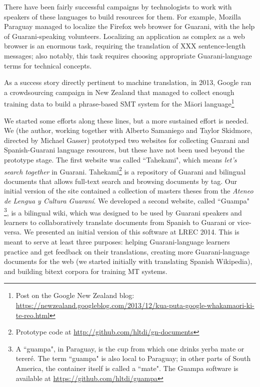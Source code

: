 There have been fairly successful campaigns by technologists to work with
speakers of these languages to build resources for them.
For example, Mozilla Paraguay managed to localize the Firefox web browser for
Guarani, with the help of Guarani-speaking volunteers. Localizing an
application as complex as a web browser is an enormous task, requiring the
translation of XXX sentence-length messages; also notably, this task requires
choosing appropriate Guarani-language terms for technical concepts.

As a success story directly pertinent to machine translation, in 2013, Google
ran a crowdsourcing campaign in New Zealand that managed to collect
enough training data to build a phrase-based SMT system for the Māori
language\footnote{Post on the Google New Zealand blog:
\url{https://newzealand.googleblog.com/2013/12/kua-puta-google-whakamaori-ki-te-reo.html}}



We started some efforts along these lines, but a more sustained effort is
needed. We (the author, working together with Alberto Samaniego and Taylor
Skidmore, directed by Michael Gasser) prototyped two websites for collecting
Guarani and Spanish-Guarani language resources, but these have not been used
beyond the prototype stage.
The first website was called ``Tahekami", which means \emph{let's search
together} in Guarani. Tahekami\footnote{Prototype code at
\url{http://github.com/hltdi/gn-documents}} is a repository of Guarani and
bilingual documents that allows full-text search and browsing documents by tag.
Our initial version of the site contained a collection of masters theses from
the \emph{Ateneo de Lengua y Cultura Guaraní}.
We developed a second website, called ``Guampa" \footnote{A ``guampa", in
Paraguay, is the cup from which one drinks yerba mate or tereré. The term
``guampa" is also local to Paraguay; in other parts of South America, the
container itself is called a ``mate". The Guampa software is available at
\url{https://github.com/hltdi/guampa}}, is a bilingual wiki, which was designed
to be used by Guarani speakers and learners to collaboratively translate
documents from Spanish to Guarani or vice-versa. We presented an initial version
of this software at LREC 2014\cite{RUDNICK14.151}. This is meant to serve at
least three purposes: helping Guarani-language learners practice and get
feedback on their translations, creating more Guarani-language documents for the
web (we started initially with translating Spanish Wikipedia), and building
bitext corpora for training MT systems.

